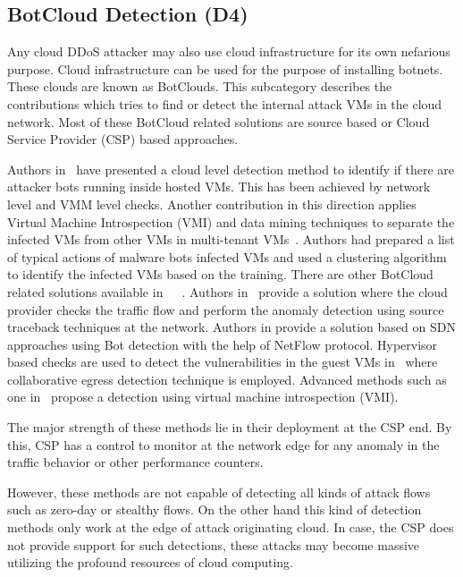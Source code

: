 \documentclass[final,5p,times,twocolumn]{elsarticle}
\begin{document}
\subsection{BotCloud Detection (D4)}
\label{BotCloud}
{Any cloud DDoS attacker may also use cloud infrastructure for its own nefarious purpose. Cloud infrastructure can be used for the purpose of installing botnets. These clouds are known as BotClouds. This subcategory describes the contributions which tries to find or detect the internal attack VMs in the cloud network. Most of these BotCloud related solutions are source based or Cloud Service Provider (CSP) based approaches. }

{Authors in~\cite{latanicki} have presented a cloud level detection method to identify if there are attacker bots running inside hosted VMs. This has been achieved by network level and VMM level checks. Another contribution in this direction applies Virtual Machine Introspection (VMI) and data mining techniques to separate the infected VMs from other VMs in multi-tenant VMs~\cite{mauro2}. Authors had prepared a list of typical actions of malware bots infected VMs and used a clustering algorithm to identify the infected VMs based on the training. There are other BotCloud related solutions available in~\cite{youcant}~\cite{botcloudGraham}~\cite{botcloudBadis}. Authors in~\cite{youcant} provide a solution where the cloud provider checks the traffic flow and perform the anomaly detection using source traceback techniques at the network. Authors in\cite{botcloudGraham} provide a solution based on SDN approaches using Bot detection with the help of NetFlow protocol. Hypervisor based checks are used to detect the vulnerabilities in the guest VMs in~\cite{botcloudBadis} where collaborative egress detection technique is employed. Advanced methods such as one in~\cite{mauro2} propose a detection using virtual machine introspection (VMI). }

{The major strength of these methods lie in their deployment at the CSP end. By this, CSP has a control to monitor at the network edge for any anomaly in the traffic behavior or other performance counters. }

{However, these methods are not capable of detecting all kinds of attack flows such as zero-day or stealthy flows. On the other hand this kind of detection methods only work at the edge of attack originating cloud. In case, the CSP does not provide support for such detections, these attacks may become massive utilizing the profound resources of cloud computing. }
\end{document}
